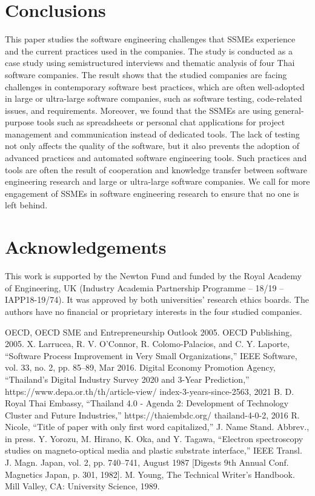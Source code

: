 \documentclass[conference]{IEEEtran}
\begin{document}
\section{Conclusions }
This paper studies the software engineering challenges that
SSMEs experience and the current practices used in the
companies. The study is conducted as a case study using semistructured interviews and thematic analysis of four Thai software companies. The result shows that the studied companies
are facing challenges in contemporary software best practices,
which are often well-adopted in large or ultra-large software
companies, such as software testing, code-related issues, and
requirements. Moreover, we found that the SSMEs are using
general-purpose tools such as spreadsheets or personal chat
applications for project management and communication instead of dedicated tools. The lack of testing not only affects
the quality of the software, but it also prevents the adoption of
advanced practices and automated software engineering tools.
Such practices and tools are often the result of cooperation
and knowledge transfer between software engineering research
and large or ultra-large software companies. We call for more
engagement of SSMEs in software engineering research to
ensure that no one is left behind.

\section*{Acknowledgements}
This work is supported by the Newton Fund and funded by
the Royal Academy of Engineering, UK (Industry Academia
Partnership Programme – 18/19 – IAPP18-19/74). It was
approved by both universities’ research ethics boards. The
authors have no financial or proprietary interests in the four
studied companies.


\begin{thebibliography}{00}
 OECD, OECD SME and Entrepreneurship Outlook 2005. OECD
Publishing, 2005.
 X. Larrucea, R. V. O’Connor, R. Colomo-Palacios, and C. Y. Laporte,
“Software Process Improvement in Very Small Organizations,” IEEE
Software, vol. 33, no. 2, pp. 85–89, Mar 2016.
 Digital Economy Promotion Agency, “Thailand’s Digital Industry Survey 2020 and 3-Year Prediction,” https://www.depa.or.th/th/article-view/
index-3-years-since-2563, 2021
 B. D. Royal Thai Embassy, “Thailand 4.0 - Agenda 2: Development
of Technology Cluster and Future Industries,” https://thaiembdc.org/
thailand-4-0-2, 2016
 R. Nicole, ``Title of paper with only first word capitalized,'' J. Name Stand. Abbrev., in press.
 Y. Yorozu, M. Hirano, K. Oka, and Y. Tagawa, ``Electron spectroscopy studies on magneto-optical media and plastic substrate interface,'' IEEE Transl. J. Magn. Japan, vol. 2, pp. 740--741, August 1987 [Digests 9th Annual Conf. Magnetics Japan, p. 301, 1982].
 M. Young, The Technical Writer's Handbook. Mill Valley, CA: University Science, 1989.
\end{thebibliography}
\vspace{12pt}
\end{document}

